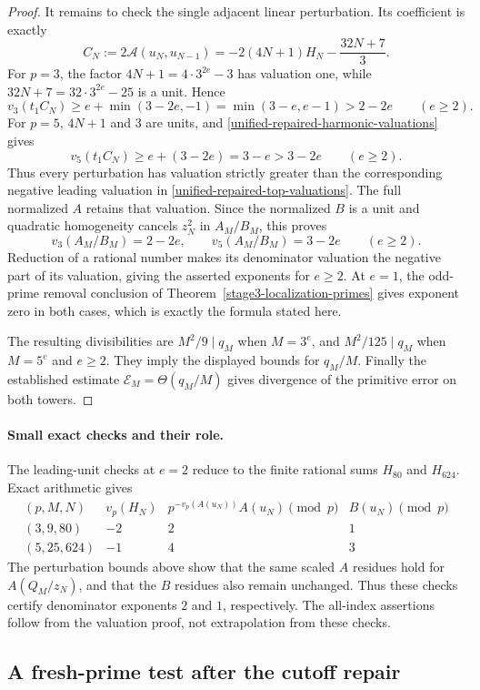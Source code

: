 \documentclass[11pt,a4paper]{article}
\theoremstyle{definition}
\theoremstyle{remark}
\begin{document}
\begin{proof}
It remains to check the single adjacent linear perturbation.
Its coefficient is exactly
\[
 C_N:=2\mathcal A(u_N,u_{N-1})
 =-2(4N+1)H_N-\frac{32N+7}{3}.
\]
For $p=3$, the factor $4N+1=4\cdot3^{2e}-3$ has valuation
one, while $32N+7=32\cdot3^{2e}-25$ is a unit.  Hence
\[
 v_3(t_1C_N)\ge e+\min(3-2e,-1)
 =\min(3-e,e-1)>2-2e\qquad(e\ge2).
\]
For $p=5$, $4N+1$ and $3$ are units, and
\eqref{unified-repaired-harmonic-valuations} gives
\[
 v_5(t_1C_N)\ge e+(3-2e)=3-e>3-2e
 \qquad(e\ge2).
\]
Thus every perturbation has valuation strictly greater than the
corresponding negative leading valuation in
\eqref{unified-repaired-top-valuations}.  The full normalized
$A$ retains that valuation.  Since the normalized $B$ is a unit
and quadratic homogeneity cancels $z_N^2$ in $A_M/B_M$, this proves
\[
 v_3(A_M/B_M)=2-2e,
 \qquad
 v_5(A_M/B_M)=3-2e
 \qquad(e\ge2).
\]
Reduction of a rational number makes its denominator valuation
the negative part of its valuation, giving the asserted exponents
for $e\ge2$.  At $e=1$, the odd-prime removal conclusion of
Theorem~\ref{stage3-localization-primes} gives exponent zero in
both cases, which is exactly the formula stated here.

The resulting divisibilities are $M^2/9\mid q_M$ when
$M=3^e$, and $M^2/125\mid q_M$ when $M=5^e$ and $e\ge2$.
They imply the displayed bounds for $q_M/M$.
Finally the established estimate
$\mathcal E_M=\Theta(q_M/M)$ gives divergence of the primitive
error on both towers.
\end{proof}

\paragraph{Small exact checks and their role.}
The leading-unit checks at $e=2$ reduce to the finite rational sums
$H_{80}$ and $H_{624}$.  Exact arithmetic gives
\[
 \begin{array}{c|c|c|c}
 (p,M,N)&v_p(H_N)&
 p^{-v_p(A(u_N))}A(u_N)\pmod p&B(u_N)\pmod p\\ \hline
 (3,9,80)&-2&2&1\\
 (5,25,624)&-1&4&3
 \end{array}
\]
The perturbation bounds above show that the same scaled $A$
residues hold for $A(Q_M/z_N)$, and that the $B$ residues also
remain unchanged.  Thus these checks certify denominator exponents
$2$ and $1$, respectively.  The all-index assertions follow from
the valuation proof, not extrapolation from these checks.

\subsection{A fresh-prime test after the cutoff repair}
\label{sec:stage3-fresh-primes}
\end{document}
